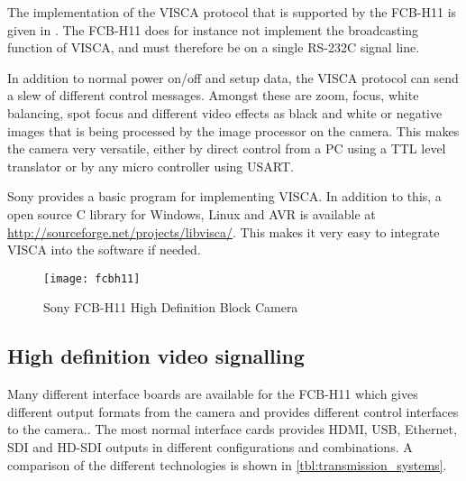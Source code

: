 The implementation of the VISCA protocol that is supported by the FCB-H11 is given in \citet{fcbh11tech}. 
The FCB-H11 does for instance not implement the broadcasting function of VISCA, and must therefore 
be on a single RS-232C signal line. 

In addition to normal power on/off and setup data, the VISCA protocol can send a slew of different 
control messages. Amongst these are zoom, focus, white balancing, spot focus and different video effects as 
black and white or negative images that is being processed by the image processor on the camera. This 
makes the camera very versatile, either by direct control from a PC using a TTL level translator or 
by any micro controller using USART.

Sony provides a basic program for implementing VISCA. In addition to this, a open source C library for Windows, Linux and 
AVR is available at \url{http://sourceforge.net/projects/libvisca/}. This makes it very easy to 
integrate VISCA into the software if needed.

\begin{figure}[htbp]
	\centering
	\texttt{[image: fcbh11]}
	\caption{Sony FCB-H11 High Definition Block Camera}
	\label{fig:fcb-h11}
\end{figure}

\subsection{High definition video signalling}

Many different interface boards are available for the FCB-H11 which gives different output formats from the camera and 
provides different control interfaces to the camera..
The most normal interface cards provides HDMI, USB, Ethernet, SDI and HD-SDI outputs in 
different configurations and combinations. A comparison of the different technologies is shown in \vref{tbl:transmission_systems}.

